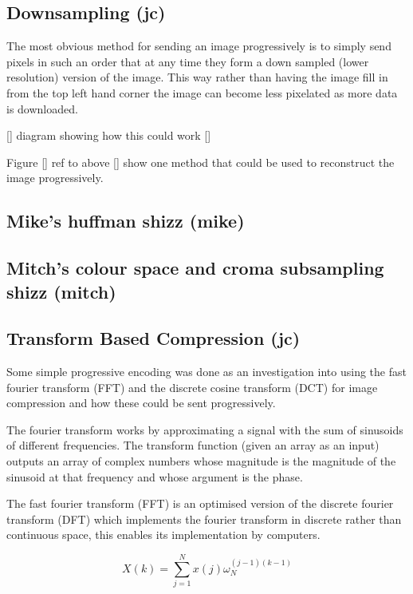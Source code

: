 \subsection{Downsampling (jc)}
\label{downsampling}

The most obvious method for sending an image progressively is to simply send pixels in such an order that at any time they form a down sampled (lower resolution) version of the image. This way rather than having the image fill in from the top left hand corner the image can become less pixelated as more data is downloaded.

[] diagram showing how this could work []

Figure [] ref to above [] show one method that could be used to reconstruct the image progressively.

\subsection{Mike's huffman shizz (mike)} %

\subsection{Mitch's colour space and croma subsampling shizz (mitch)} %

\subsection{Transform Based Compression (jc)}
\label{transfom_based}

Some simple progressive encoding was done as an investigation into using the fast fourier transform (FFT) and the discrete cosine transform (DCT) for image compression and how these could be sent progressively.

The fourier transform works by approximating a signal with the sum of sinusoids of different frequencies. The transform function (given an array as an input) outputs an array of complex numbers whose magnitude is the magnitude of the sinusoid at that frequency and whose argument is the phase.

The fast fourier transform (FFT) is an optimised version of the discrete fourier transform (DFT) which implements the fourier transform in discrete rather than continuous space, this enables its implementation by computers.

\begin{equation}
X(k) = \sum_{j=1}^N x(j)\omega _N ^{(j-1)(k-1)}
\label{FFT1_eq}
\end{equation}

